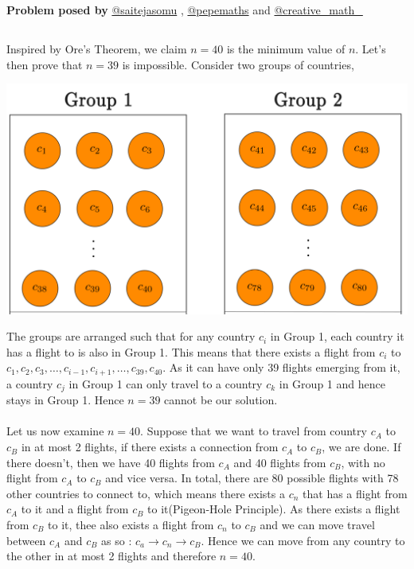 \documentclass[12pt]{article}
\begin{document}
\begin{flushright}
\textbf{Problem posed by}
\textcolor{RoyalBlue2}{\href{https://www.instagram.com/saitejasomu/}{@saitejasomu}} , \textcolor{RoyalBlue2}{\href{https://www.instagram.com/pepemaths/}{@pepemaths}} and \textcolor{RoyalBlue2}{\href{https://www.instagram.com/creative_math_/}{@creative\_math\_}}
\end{flushright}



\subsection*{ }
Inspired by Ore's Theorem, we claim $n = 40$ is the minimum value of $n$. Let's then prove that $n = 39$ is impossible. Consider two groups of countries,
\begin{center}
    \includegraphics[width=16cm]{Figure 2.5.png}
\end{center}
The groups are arranged such that for any country $c_i$ in Group 1, each country it has a flight to is also in Group 1. This means that there exists a flight from $c_i$ to $c_1,c_2,c_3,\dots, c_{i-1}, c_{i+1}, \dots, c_{39}, c_{40}$. As it can have only 39 flights emerging from it, a country $c_j$ in Group 1 can only travel to a country $c_k$ in Group 1 and hence stays in Group 1. Hence $n= 39 $ cannot be our solution. \\ \\ Let us now examine $n = 40$. Suppose that we want to travel from country $c_A$ to $c_B$ in at most 2 flights, if there exists a connection from $c_A$ to $c_B$, we are done. If there doesn't, then we have 40 flights from $c_A$ and 40 flights from $c_B$, with no flight from $c_A$ to $c_B$ and vice versa. In total, there are 80 possible flights with 78 other countries to connect to, which means there exists a $c_n$ that has a flight from $c_A$ to it and a flight from $c_B$ to it(Pigeon-Hole Principle). As there exists a flight from $c_B$ to it, thee also exists a flight from $c_n$ to $c_B$ and we can move travel between $c_A$ and $c_B$ as so : $c_a \rightarrow c_n \rightarrow c_B$. Hence we can move from any country to the other in at most 2 flights and therefore $n = 40$. 
\end{document}
